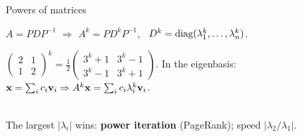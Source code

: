 \documentclass[aspectratio=1610,11pt]{beamer}
\begin{document}

\begin{frame}{Powers of matrices}
    \begin{proposition}
        \small $A = PDP^{-1}$ $\Rightarrow$ $A^k = PD^kP^{-1}$, \ $D^k = \operatorname{diag}(\lambda_1^k, \ldots, \lambda_n^k)$.
    \end{proposition}
    \small
    $\begin{pmatrix} 2 & 1 \\ 1 & 2 \end{pmatrix}^k = \frac{1}{2}\begin{pmatrix} 3^k + 1 & 3^k - 1 \\ 3^k - 1 & 3^k + 1 \end{pmatrix}$. \quad In the eigenbasis: $\mathbf{x} = \sum_ic_i\mathbf{v}_i \Rightarrow A^k\mathbf{x} = \sum_ic_i\lambda_i^k\mathbf{v}_i$.
    \\[0.3em]
    \centering{}
    \\[0.1em]
    \raggedright The largest $|\lambda_i|$ wins: \textbf{power iteration} (PageRank); speed $|\lambda_2/\lambda_1|$.
\end{frame}
\end{document}
